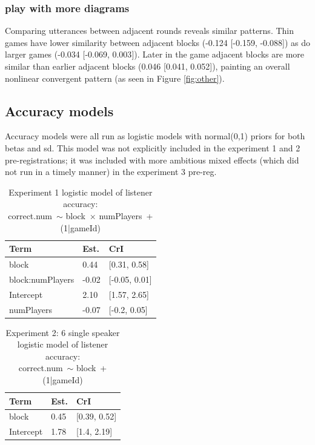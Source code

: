 \documentclass[
  english,
  a4paper,
]{article}
\begin{document}
\hypertarget{play-with-more-diagrams}{%
\subsubsection{play with more diagrams}\label{play-with-more-diagrams}}

Comparing utterances between adjacent rounds reveals similar patterns. Thin games have lower similarity between adjacent blocks (-0.124 {[}-0.159, -0.088{]}) as do larger games (-0.034 {[}-0.069, 0.003{]}). Later in the game adjacent blocks are more similar than earlier adjacent blocks (0.046 {[}0.041, 0.052{]}), painting an overall nonlinear convergent pattern (as seen in Figure \ref{fig:other}).

\hypertarget{accuracy-models}{%
\subsection{Accuracy models}\label{accuracy-models}}

Accuracy models were all run as logistic models with normal(0,1) priors for both betas and sd. This model was not explicitly included in the experiment 1 and 2 pre-registrations; it was included with more ambitious mixed effects (which did not run in a timely manner) in the experiment 3 pre-reg.

\begin{table}[h!]

\caption{\label{tab:unnamed-chunk-11}Experiment 1 logistic model of listener accuracy:\\ correct.num~$\sim$ block~$\times$ numPlayers~+ (1|gameId)}
\centering
\begin{tabular}[t]{lll}
\toprule
Term & Est. & CrI\\
\midrule
block & 0.44 & {}[0.31, 0.58]\\
block:numPlayers & -0.02 & {}[-0.05, 0.01]\\
Intercept & 2.10 & {}[1.57, 2.65]\\
numPlayers & -0.07 & {}[-0.2, 0.05]\\
\bottomrule
\end{tabular}
\end{table}

\begin{table}[h!]

\caption{\label{tab:unnamed-chunk-11}Experiment 2: 6 single speaker logistic model of listener accuracy:\\ correct.num~$\sim$ block~+ (1|gameId)}
\centering
\begin{tabular}[t]{lll}
\toprule
Term & Est. & CrI\\
\midrule
block & 0.45 & {}[0.39, 0.52]\\
Intercept & 1.78 & {}[1.4, 2.19]\\
\bottomrule
\end{tabular}
\end{table}
\end{document}
